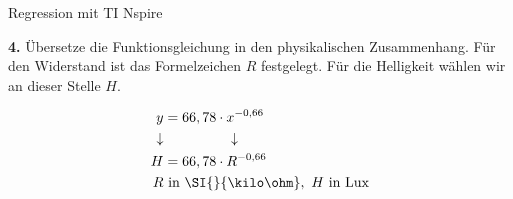 \begin{zsfg}{Regression mit TI Nspire}
	\bigskip
	\begin{minipage}[c][3cm][t]{0.48\textwidth}
		\textbf{4.} Übersetze die Funktionsgleichung in den physikalischen Zusammenhang. Für den Widerstand ist das Formelzeichen $R$ festgelegt. Für die Helligkeit wählen wir an dieser Stelle $H$.
	\end{minipage}
	\hfill
	\begin{minipage}[c][3cm][t]{0.48\textwidth}
		\centering
		\vspace{-\baselineskip}
		\begin{align*}
			y &= 66,78 \cdot x^{-0,66} \\
			\downarrow & \hspace{1.6cm}\downarrow \\
			H &= 66,78 \cdot R^{-0,66} \\
			R &\text{ in } \SI{}{\kilo\ohm}, ~ H \text{ in Lux} 
		\end{align*}
	\end{minipage}
\end{zsfg}
\vfill

